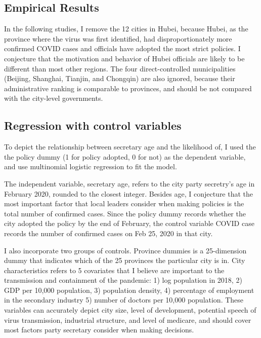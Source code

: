 \documentclass{article}
\begin{document}
\begin{CJK}{UTF8}{gbsn}
\section{Empirical Results} 

In the following studies, I remove the 12 cities in Hubei, because Hubei, as the province where the virus was first identified, had disproportionately more confirmed COVID cases and officials have adopted the most strict policies. I conjecture that the motivation and behavior of Hubei officials are likely to be different than most other regions. The four direct-controlled municipalities (Beijing, Shanghai, Tianjin, and Chongqin) are also ignored, because their administrative ranking is comparable to provinces, and should be not compared with the city-level governments.

\subsection{Regression with control variables}

To depict the relationship between secretary age and the likelihood of, I used the the policy dummy (1 for policy adopted, 0 for not) as the dependent variable, and use multinomial logistic regression to fit the model. 

The independent variable, secretary age, refers to the city party secretry's age in February 2020, rounded to the closest integer. Besides age, I conjecture that the most important factor that local leaders consider when making policies is the total number of confirmed cases. Since the policy dummy records whether the city adopted the policy by the end of February, the control variable COVID case records the number of confirmed cases on Feb 25, 2020 in that city.

I also incorporate two groups of controls. Province dummies is a 25-dimension dummy that indicates which of the 25 provinces the particular city is in. City characteristics refers to 5 covariates that I believe are important to the transmission and containment of the pandemic: 1) log population in 2018, 2) GDP per 10,000 population, 3) population density, 4) percentage of employment in the secondary industry 5) number of doctors per 10,000 population. These variables can accurately depict city size, level of development, potential speech of virus transmission, industrial structure, and level of medicare, and should cover most factors party secretary consider when making decisions.




\end{CJK}
\end{document}
